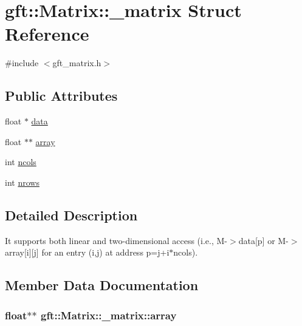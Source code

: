 \hypertarget{structgft_1_1Matrix_1_1__matrix}{}\section{gft\+:\+:Matrix\+:\+:\+\_\+matrix Struct Reference}
\label{structgft_1_1Matrix_1_1__matrix}


{\ttfamily \#include $<$gft\+\_\+matrix.\+h$>$}

\subsection*{Public Attributes}
\begin{DoxyCompactItemize}
\item 
float $\ast$ \hyperlink{structgft_1_1Matrix_1_1__matrix_af255bafdb1d32fb340b7b0f41bc720f7}{data}
\item 
float $\ast$$\ast$ \hyperlink{structgft_1_1Matrix_1_1__matrix_ab2bc546bbf265862578313c4428a4283}{array}
\item 
int \hyperlink{structgft_1_1Matrix_1_1__matrix_a4b61985e3d0ec2950798d37bfcec916a}{ncols}
\item 
int \hyperlink{structgft_1_1Matrix_1_1__matrix_a0c4817339b3dd2b842cb2fd66df70bcc}{nrows}
\end{DoxyCompactItemize}


\subsection{Detailed Description}
It supports both linear and two-\/dimensional access (i.\+e., M-\/$>$data\mbox{[}p\mbox{]} or M-\/$>$array\mbox{[}i\mbox{]}\mbox{[}j\mbox{]} for an entry (i,j) at address p=j+i$\ast$ncols). 

\subsection{Member Data Documentation}
\subsubsection[{\texorpdfstring{array}{array}}]{\setlength{\rightskip}{0pt plus 5cm}float$\ast$$\ast$ gft\+::\+Matrix\+::\+\_\+matrix\+::array}\hypertarget{structgft_1_1Matrix_1_1__matrix_ab2bc546bbf265862578313c4428a4283}{}\label{structgft_1_1Matrix_1_1__matrix_ab2bc546bbf265862578313c4428a4283}
